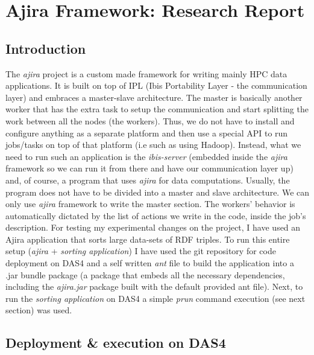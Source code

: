 \section{Ajira Framework: Research Report}

\subsection{Introduction}

The \textit{ajira} project is a custom made framework for writing mainly HPC data applications. It is built on top of IPL (Ibis Portability Layer - the communication layer) and embraces a master-slave architecture. The master is basically another worker that has the extra task to setup the communication and start splitting the work between all the nodes (the workers). Thus, we do not have to install and configure anything as a separate platform and then use a special API to run jobs/tasks on top of that platform (i.e such as using Hadoop). Instead, what we need to run such an application is the \textit{ibis-server} (embedded inside the \textit{ajira} framework so we can run it from there and have our communication layer up) and, of course, a program that uses \textit{ajira} for data computations. Usually, the program does not have to be divided into a master and slave architecture. We can only use \textit{ajira} framework to write the master section. The workers' behavior is automatically dictated by the list of actions we write in the code, inside the job's description. For testing my experimental changes on the project, I have used an Ajira application that sorts large data-sets of RDF triples. To run this entire setup (\textit{ajira} + \textit{sorting application}) I have used the git repository for code deployment on DAS4 and a self written \textit{ant} file \cite{build_file} to build the application into a .jar bundle package (a package that embeds all the necessary dependencies, including the \textit{ajira.jar} package built with the default provided ant file). Next, to run the \textit{sorting application} on DAS4 a simple \textit{prun} command execution (see next section) was used.

% 
\subsection{Deployment \& execution on DAS4}

